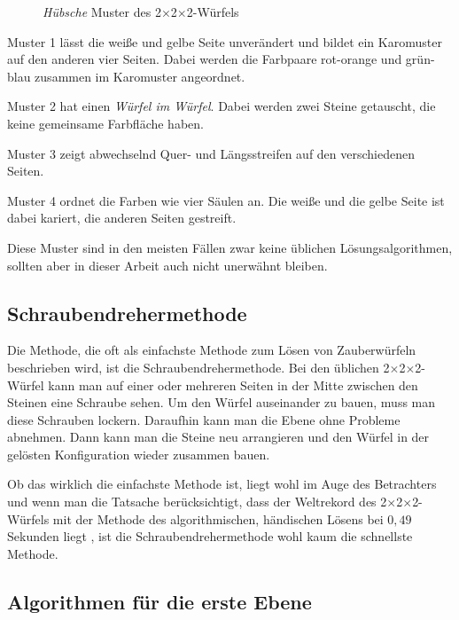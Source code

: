 \documentclass[12pt,a4paper, usenames, dvipsnames]{article}
\newcommand{\Ttwo}{2$\times$2$\times$2-}
\begin{document}
\begin{figure}[h]
\caption{\textit{Hübsche} Muster des \Ttwo Würfels}
\label{29}
\end{figure}

Muster 1 lässt die weiße und gelbe Seite unverändert und bildet ein Karomuster auf den anderen vier Seiten. Dabei werden die Farbpaare rot-orange und grün-blau zusammen im  Karomuster angeordnet.

Muster 2 hat einen \textit{Würfel im Würfel}. Dabei werden zwei Steine getauscht, die keine gemeinsame Farbfläche haben.

Muster 3 zeigt abwechselnd Quer- und Längsstreifen auf den verschiedenen Seiten.

Muster 4 ordnet die Farben wie vier Säulen an. Die weiße und die gelbe Seite ist dabei kariert, die anderen Seiten gestreift.


Diese Muster sind in den meisten Fällen zwar keine üblichen Lösungsalgorithmen, sollten aber in dieser Arbeit auch nicht unerwähnt bleiben.

%
%
%
%
%
%
%
%
%
%
%
%
%
%
%
%
%
%
%
\subsection*{Schraubendrehermethode}

Die Methode, die oft als einfachste Methode zum Lösen von Zauberwürfeln beschrieben wird, ist die Schraubendrehermethode.
Bei den üblichen \Ttwo Würfel kann man auf einer oder mehreren Seiten in der Mitte zwischen den Steinen eine Schraube sehen.
Um den Würfel auseinander zu bauen, muss man diese Schrauben lockern. Daraufhin kann man die Ebene ohne Probleme abnehmen. 
Dann kann man die Steine neu arrangieren und den Würfel in der gelösten Konfiguration wieder zusammen bauen.

Ob das wirklich die einfachste Methode ist, liegt wohl im Auge des Betrachters und wenn man die Tatsache berücksichtigt, dass der Weltrekord des \Ttwo Würfels mit der Methode des algorithmischen, händischen Lösens bei $0,49$ Sekunden liegt \cite{rekord}, ist die Schraubendrehermethode wohl kaum die schnellste Methode.

%
%
%
%
%
%
%
%
%
%
%
%
%
%
%
%
%
%
%
\subsection*{Algorithmen für die erste Ebene}
\end{document}
